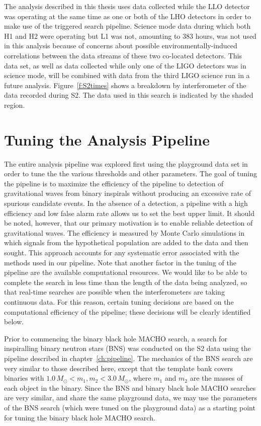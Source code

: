 The analysis described in this thesis uses data collected while the LLO
detector was operating at the same time as one or both of the LHO detectors in
order to make use of the triggered search pipeline.  Science mode data during
which both H1 and H2 were operating but L1 was not, amounting to 383 hours,
was not used in this analysis because of concerns about possible
environmentally-induced correlations between the data streams of these two
co-located detectors. This data set, as well as data collected while only one
of the LIGO detectors was in science mode, will be combined with data from the
third LIGO science run in a future analysis. Figure~\ref{f:S2times} shows a
breakdown by interferometer of the data recorded during S2. The data used in
this search is indicated by the shaded region.

\section{Tuning the Analysis Pipeline}
\label{s:s2tuning}

The entire analysis pipeline was explored first using the playground data set
in order to tune the the various thresholds and other parameters. The goal of
tuning the pipeline is to maximize the efficiency of the pipeline to detection
of gravitational waves from binary inspirals without producing an excessive
rate of spurious candidate events. In the absence of a detection, a pipeline
with a high efficiency and low false alarm rate allows us to set the best
upper limit. It should be noted, however, that our primary motivation is to
enable reliable detection of gravitational waves. The efficiency is measured
by Monte Carlo simulations in which signals from the hypothetical population
are added to the data and then sought. This approach accounts for any
systematic error associated with the methods used in our pipeline.  Note that
another factor in the tuning of the pipeline are the available computational
resources. We would like to be able to complete the search in less time than
the length of the data being analyzed, so that real-time searches are possible
when the interferometers are taking continuous data. For this reason, certain
tuning decisions are based on the computational efficiency of the pipeline;
these decisions will be clearly identified below.

Prior to commencing the binary black hole MACHO search, a search for
inspiralling binary neutron stars (BNS) was conducted on the S2 data using the
pipeline described in chapter~\ref{ch:pipeline}\cite{LIGOS2iul}. The mechanics
of the BNS search are very similar to those described here, except that the
template bank covers binaries with $1.0\,M_\odot < m_1, m_2 < 3.0\,M_\odot$,
where $m_1$ and $m_2$ are the masses of each object in the binary. Since the
BNS and binary black hole MACHO searches are very similar, and share the same
playground data, we may use the parameters of the BNS search (which were tuned
on the playground data) as a starting point for tuning the binary black hole
MACHO search. 

